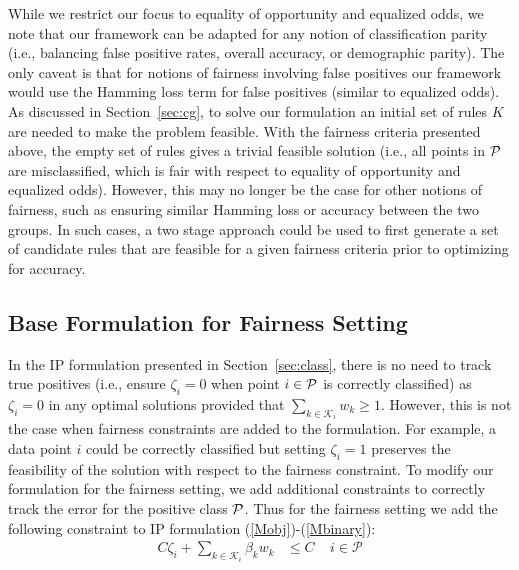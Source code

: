 \documentclass[twoside,11pt]{article}
\begin{document}
While we restrict our focus to equality of opportunity and equalized odds, we note that our framework can be adapted for any notion of classification parity (i.e., balancing false positive rates, overall accuracy, or demographic parity). The only caveat is that for notions of fairness involving false positives our framework would use the Hamming loss term for false positives (similar to equalized odds). As discussed in Section~\ref{sec:cg}, to solve our formulation an initial set of rules ${K}$ are needed to make the problem feasible. With the fairness criteria presented above, the empty set of rules gives a trivial feasible solution (i.e., all points in ${\cal P}$ are misclassified, which is fair with respect to equality of opportunity and equalized odds). However, this may no longer be the case for other notions of fairness, such as ensuring similar Hamming loss or accuracy between the two groups. In such cases, a two stage approach could be used to first generate a set of candidate rules that are feasible for a given fairness criteria prior to optimizing for accuracy.

\subsection{Base Formulation for Fairness Setting} 



In the IP formulation presented in Section~\ref{sec:class}, there is no need to track true positives (i.e., ensure $\zeta_i = 0$ when point $i \in {\cal P}$ is correctly classified) as $\zeta_i = 0$ in any optimal solutions provided that $\sum_{k \in \mathcal{K}_i} w_k\geq 1$. However, this is not the case when fairness constraints are added to the formulation. For example, a data point $i$ could be correctly classified but setting $\zeta_i = 1$ preserves the feasibility of the solution with respect to the fairness constraint. To modify our formulation for the fairness setting, we add additional constraints to correctly track the error for the positive class ${\cal P}$. Thus for the fairness setting we add the following constraint to IP formulation (\ref{Mobj})-(\ref{Mbinary}):
	\begin{align}
	C\zeta_i + \sum_{k \in \mathcal{K}_i} \beta_k w_k &\leq C ~~~~~i \in \mathcal{P} \label{MmisP2}
	\end{align}
\end{document}
